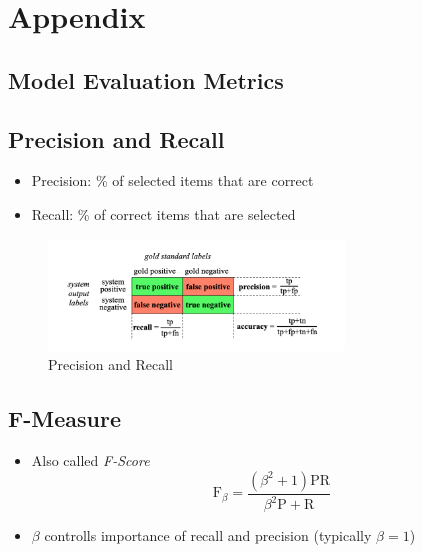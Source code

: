 \section{Appendix}
\subsection{Model Evaluation Metrics}
\subsection*{Precision and Recall}
\begin{itemize}
	\item Precision: \% of selected items that are correct
	\item Recall: \% of correct items that are selected
\end{itemize}
\begin{figure}[ht]
	\centering
	\includegraphics[width=0.7\textwidth]{figures/prec_rec.png}
	\caption{Precision and Recall}
	\label{fig:prec_rec}
\end{figure}

\subsection*{F-Measure}
\begin{itemize}
	\item Also called \textit{F-Score} $$ \mathrm{F}_\beta = \dfrac{(\beta^2 + 1) \mathrm{PR}}{\beta^2 \mathrm{P} + \mathrm{R}} $$
	\item $\beta$ controlls importance of recall and precision (typically $\beta = 1$)
\end{itemize}
